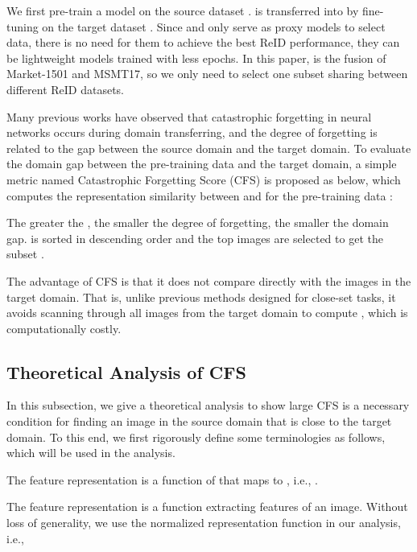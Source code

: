 \documentclass[10pt,twocolumn,letterpaper]{article}
\begin{document}
We first pre-train a model  on the source dataset .  is transferred into  by fine-tuning on the target dataset . Since  and  only serve as proxy models to select data, there is no need for them to achieve the best ReID performance, \ie they can be lightweight models trained with less epochs. In this paper,  is the fusion of Market-1501 and MSMT17, so we only need to select one subset  sharing between different ReID datasets.

Many previous works \cite{thompson2019overcoming,kirkpatrick2017overcoming,ramasesh2021anatomy} have observed that catastrophic forgetting in neural networks occurs during domain transferring, and the degree of forgetting is related to the gap between the source domain and the target domain. To evaluate the domain gap between the pre-training data and the target domain, a simple metric named Catastrophic Forgetting Score (CFS) is proposed as below, which computes the representation similarity between  and  for the pre-training data :

The greater the , the smaller the degree of forgetting, \ie the smaller the domain gap.   is sorted in descending order and the top  images are selected to get the subset .

The advantage of  CFS is that it does not compare  directly with the images in the target domain. That is, unlike previous methods designed for close-set tasks, it avoids scanning through all images from the target domain to compute , which is computationally costly. 

\subsection{Theoretical Analysis of CFS}\label{subsec:math:cfs}
In this subsection, we give a theoretical analysis to show large CFS is a necessary condition for finding an image in the source domain that is close to the target domain. To this end, we first rigorously define some terminologies as follows, which will be used in the analysis.
\begin{definition}The feature representation  is a function of  that maps to , i.e., .
\end{definition}
The feature representation  is a function extracting features of an image. Without loss of generality, we use the normalized representation function in our analysis, i.e., 
\end{document}

